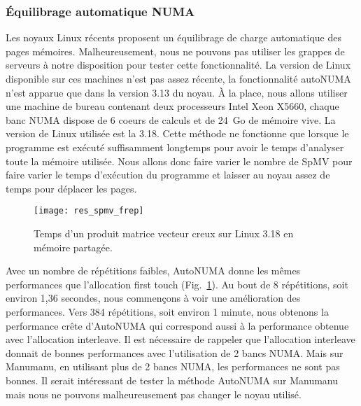 \subsubsection{\'Equilibrage automatique NUMA}
Les noyaux Linux récents proposent un équilibrage de charge automatique des pages mémoires.
%
Malheureusement, nous ne pouvons pas utiliser les grappes de serveurs à notre disposition pour tester cette fonctionnalité.
%
La version de Linux disponible sur ces machines n'est pas assez récente, la fonctionnalité autoNUMA n'est apparue que dans la version 3.13 du noyau.
%
\`A la place, nous allons utiliser une machine de bureau contenant deux processeurs Intel Xeon X5660, chaque banc NUMA dispose de 6 coeurs de calculs et de 24~Go de mémoire vive.
%
La version de Linux utilisée est la 3.18.
%
Cette méthode ne fonctionne que lorsque le programme est exécuté suffisamment longtemps pour avoir le temps d'analyser toute la mémoire utilisée.
%
Nous allons donc faire varier le nombre de SpMV pour faire varier le temps d'exécution du programme et laisser au noyau assez de temps pour déplacer les pages.


\begin{figure}
  \centering
  \texttt{[image: res\_spmv\_frep]}
  \caption{Temps d'un produit matrice vecteur creux sur Linux 3.18 en mémoire partagée.}
  \label{fig:res_spmv_frep}
\end{figure}


Avec un nombre de répétitions faibles, AutoNUMA donne les mêmes performances que l'allocation first touch (Fig.~\ref{fig:res_spmv_frep}).
%
Au bout de 8 répétitions, soit environ 1,36 secondes, nous commençons à voir une amélioration des performances.
%
Vers 384 répétitions, soit environ 1 minute, nous obtenons la performance crête d'AutoNUMA qui correspond aussi à la performance obtenue avec l'allocation interleave.
%
Il est nécessaire de rappeler que l'allocation interleave donnait de bonnes performances avec l'utilisation de 2 bancs NUMA.
%
Mais sur Manumanu, en utilisant plus de 2 bancs NUMA, les performances ne sont pas bonnes.
%
Il serait intéressant de tester la méthode AutoNUMA sur Manumanu mais nous ne pouvons malheureusement pas changer le noyau utilisé.
